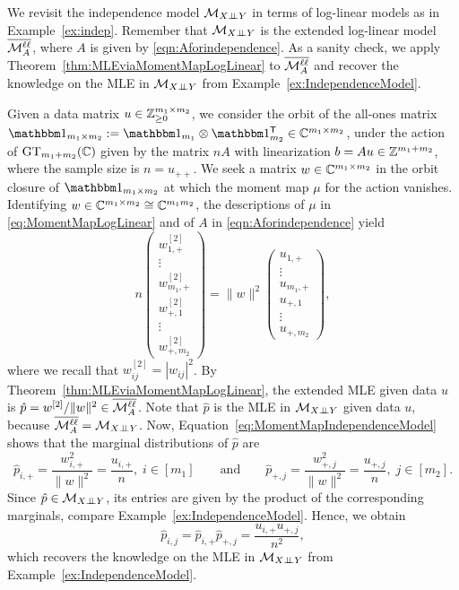 \begin{example}
	\label{ex:indep2}
	We revisit the independence model $\mathcal{M}_{X {\perp\!\!\!\perp} Y}$ in terms of log-linear models as in Example~\ref{ex:indep}. Remember that $\mathcal{M}_{X {\perp\!\!\!\perp} Y}$ is the extended log-linear model $\overline{\mathcal{M}^{\mathtt{\ell \ell}}_A}$, where $A$ is given by \eqref{eqn:Aforindependence}. As a sanity check, we apply Theorem~\ref{thm:MLEviaMomentMapLogLinear} to $\overline{\mathcal{M}^{\mathtt{\ell \ell}}_A}$ and recover the knowledge on the MLE in $\mathcal{M}_{X {\perp\!\!\!\perp} Y}$ from Example~\ref{ex:IndependenceModel}.
	
	Given a data matrix $u \in \mathbb Z_{\geq0}^{m_1 \times m_2}$, we consider the orbit of the all-ones matrix $\ones_{m_1 \times m_2} := \ones_{m_1} \otimes \ones\T_{m_2} \in \CC^{m_1 \times m_2}$, under the action of $\operatorname{GT}_{m_1 + m_2}(\mathbb C)$ given by the matrix $nA$ with linearization $b = Au \in \mathbb Z^{m_1 + m_2}$, where the sample size is $n = u_{++}$.
	We seek a matrix $w \in \mathbb C^{m_1 \times m_2}$ in the orbit closure of $\ones_{m_1 \times m_2}$ at which the moment map $\mu$ for the action vanishes. Identifying $w \in \mathbb C^{m_1 \times m_2} \cong \mathbb C^{m_1 m_2}$, the descriptions of $\mu$ in \eqref{eq:MomentMapLogLinear} and of $A$ in \eqref{eqn:Aforindependence} yield
		\begin{equation}\label{eq:MomentMapIndependenceModel}
			n \begin{pmatrix} w^{[2]}_{1,+} \\ \vdots \\ w^{[2]}_{m_1,+} \\[3pt] w^{[2]}_{+,1} \\ \vdots \\ w^{[2]}_{+,m_2} \end{pmatrix} = \| w \|^2 \begin{pmatrix} u_{1,+} \\ \vdots \\ u_{m_1,+} \\ u_{+,1} \\ \vdots \\ u_{+,m_2} \end{pmatrix} ,
		\end{equation}
	where we recall that $w^{[2]}_{ij} = |w_{ij}|^2$.
	By Theorem~\ref{thm:MLEviaMomentMapLogLinear}, the extended MLE given data $u$ is $\hat{p} = w^{[2]} / \|w\|^2 \in \overline{\mathcal{M}^{\mathtt{\ell \ell}}_A}$. Note that $\hat{p}$ is the MLE in $\mathcal{M}_{X {\perp\!\!\!\perp} Y}$ given data $u$, because $\overline{\mathcal{M}^{\mathtt{\ell \ell}}_A} = \mathcal{M}_{X {\perp\!\!\!\perp} Y}$.
	Now, Equation~\eqref{eq:MomentMapIndependenceModel} shows that the marginal distributions of $\hat{p}$ are	
		\[ \hat{p}_{i,+} = \frac{w^{2}_{i,+}}{\|w\|^2} = \frac{u_{i,+}}{n} , \; i \in [m_1] \qquad \text{and} \qquad
		\hat{p}_{+,j} = \frac{w^{2}_{+,j}}{\|w\|^2} = \frac{u_{+,j}}{n} , \; j \in [m_2].  \]
	Since $\hat{p} \in \mathcal{M}_{X {\perp\!\!\!\perp} Y}$, its entries are given by the product of the corresponding marginals, compare Example~\ref{ex:IndependenceModel}. Hence, we obtain
		\[ \hat{p}_{i,j} = \hat{p}_{i,+} \hat{p}_{+,j} = \frac{u_{i,+} u_{+,j}}{n^2}, \]
	which recovers the knowledge on the MLE in $\mathcal{M}_{X {\perp\!\!\!\perp} Y}$ from Example~\ref{ex:IndependenceModel}. 
	

\end{example}
